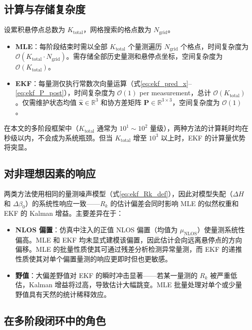 \subsection{计算与存储复杂度}

设累积悬停点总数为 $K_{\mathrm{total}}$，网格搜索的格点数为 $N_{\mathrm{grid}}$。

\begin{itemize}
    \item \textbf{MLE}：每阶段结束时需以全部 $K_{\mathrm{total}}$ 个量测遍历 $N_{\mathrm{grid}}$ 个格点，时间复杂度为 $\mathcal{O}(K_{\mathrm{total}}\cdot N_{\mathrm{grid}})$。需存储全部历史量测和悬停点坐标，空间复杂度为 $\mathcal{O}(K_{\mathrm{total}})$。
    \item \textbf{EKF}：每量测仅执行常数次向量运算（式\eqref{eq:ekf_pred_x}--\eqref{eq:ekf_P_post}），时间复杂度为 $\mathcal{O}(1)$ per measurement，总计 $\mathcal{O}(K_{\mathrm{total}})$。仅需维护状态均值 $\hat{\mathbf{x}}\in\mathbb{R}^3$ 和协方差矩阵 $\mathbf{P}\in\mathbb{R}^{3\times 3}$，空间复杂度为 $\mathcal{O}(1)$。
\end{itemize}

在本文的多阶段框架中（$K_{\mathrm{total}}$ 通常为 $10^1\sim 10^2$ 量级），两种方法的计算耗时均在秒级以内，不会成为系统瓶颈。但当 $K_{\mathrm{total}}$ 增至 $10^3$ 以上时，EKF 的计算量优势将突显。

\subsection{对非理想因素的响应}

两类方法使用相同的量测噪声模型（式\eqref{eq:ekf_Rk_def}），因此对模型失配（$\Delta H$ 和 $\Delta\beta_0$）的系统性响应一致——$R_k$ 的估计偏差会同时影响 MLE 的似然权重和 EKF 的 Kalman 增益。主要差异在于：

\begin{itemize}
    \item \textbf{NLOS 偏置}：仿真中注入的正值 NLOS 偏置（均值为 $\mu_{\mathrm{NLOS}}$）使量测系统性偏高。MLE 和 EKF 均未显式建模该偏置，因此估计会向远离悬停点的方向偏移。MLE 的批量性质使其可通过残差分析检测异常量测，而 EKF 的递推性质使其对单个偏置量测的响应更即时但也更敏感。
    \item \textbf{野值}：大偏差野值对 EKF 的瞬时冲击显著——若某一量测的 $R_k$ 被严重低估，Kalman 增益将过高，导致估计大幅跳变。MLE 批量处理对单个或少量野值具有天然的统计稀释效应。
\end{itemize}

\subsection{在多阶段闭环中的角色}

